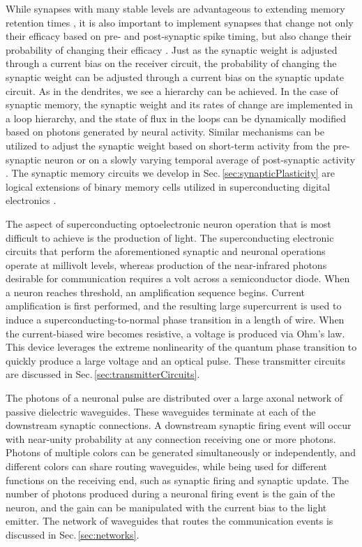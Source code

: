 \documentclass[twocolumn]{article}
\begin{document}
While synapses with many stable levels are advantageous to extending memory retention times \cite{fuab2007}, it is also important to implement synapses that change not only their efficacy based on pre- and post-synaptic spike timing, but also change their probability of changing their efficacy \cite{fudr2005}. Just as the synaptic weight is adjusted through a current bias on the receiver circuit, the probability of changing the synaptic weight can be adjusted through a current bias on the synaptic update circuit. As in the dendrites, we see a hierarchy can be achieved. In the case of synaptic memory, the synaptic weight and its rates of change are implemented in a loop hierarchy, and the state of flux in the loops can be dynamically modified based on photons generated by neural activity. Similar mechanisms can be utilized to adjust the synaptic weight based on short-term activity from the pre-synaptic neuron \cite{abre2004} or on a slowly varying temporal average of post-synaptic activity \cite{bico1982,cobe2012}. The synaptic memory circuits we develop in Sec.\,\ref{sec:synapticPlasticity} are logical extensions of binary memory cells utilized in superconducting digital electronics \cite{vatu1998,ka1999}.

The aspect of superconducting optoelectronic neuron operation that is most difficult to achieve is the production of light. The superconducting electronic circuits that perform the aforementioned synaptic and neuronal operations operate at millivolt levels, whereas production of the near-infrared photons desirable for communication requires a volt across a semiconductor diode. When a neuron reaches threshold, an amplification sequence begins. Current amplification is first performed, and the resulting large supercurrent is used to induce a superconducting-to-normal phase transition in a length of wire. When the current-biased wire becomes resistive, a voltage is produced via Ohm's law. This device leverages the extreme nonlinearity of the quantum phase transition to quickly produce a large voltage and an optical pulse. These transmitter circuits are discussed in Sec.\,\ref{sec:transmitterCircuits}.

The photons of a neuronal pulse are distributed over a large axonal network of passive dielectric waveguides. These waveguides terminate at each of the downstream synaptic connections. A downstream synaptic firing event will occur with near-unity probability at any connection receiving one or more photons. Photons of multiple colors can be generated simultaneously or independently, and different colors can share routing waveguides, while being used for different functions on the receiving end, such as synaptic firing and synaptic update. The number of photons produced during a neuronal firing event is the gain of the neuron, and the gain can be manipulated with the current bias to the light emitter. The network of waveguides that routes the communication events is discussed in Sec.\,\ref{sec:networks}.
\end{document}

